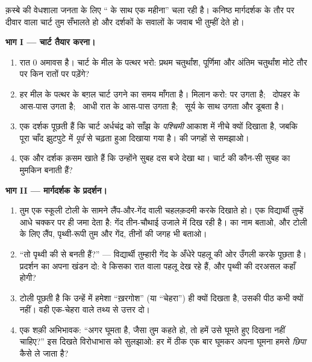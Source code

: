 \begin{problem}\label{pb:g7:moon-phases:1}
क़स्बे की वेधशाला जनता के लिए `` के साथ एक महीना'' चला रही है।
कनिष्ठ मार्गदर्शक के तौर पर दीवार वाला चार्ट तुम सँभालते हो और
दर्शकों के सवालों के जवाब भी तुम्हीं देते हो।

\medskip\noindent\textbf{भाग I --- चार्ट तैयार करना।}
\begin{enumerate}
  \item रात $0$ अमावस है। चार्ट के मील के पत्थर भरो: प्रथम
        चतुर्थांश, पूर्णिमा और अंतिम चतुर्थांश मोटे तौर पर किन रातों
        पर पड़ेंगे?
  \item हर मील के पत्थर के बग़ल चार्ट उगने का समय माँगता है। मिलान
        करो:  पर उगता है; \ दोपहर के आस-पास उगता है; \ आधी
        रात के आस-पास उगता है; \ सूर्य के साथ उगता और डूबता है।
  \item एक दर्शक पूछती हैं कि चार्ट अर्धचंद्र को साँझ के
        \emph{पश्चिमी} आकाश में नीचे क्यों दिखाता है, जबकि पूरा चाँद
        झुटपुटे में \emph{पूर्व} से चढ़ता हुआ दिखाया गया है। 
        की जगहों से समझाओ।
  \item एक और दर्शक क़सम खाते हैं कि उन्होंने सुबह दस बजे 
        देखा था। चार्ट की कौन-सी  सुबह का  मुमकिन बनाती
        हैं?
\end{enumerate}

\medskip\noindent\textbf{भाग II --- मार्गदर्शक के प्रदर्शन।}
\begin{enumerate}[resume]
  \item तुम एक स्कूली टोली के सामने लैंप-और-गेंद वाली चहलक़दमी करके
        दिखाते हो। एक विद्यार्थी तुम्हें आधे चक्कर पर ही जमा देता है:
        गेंद तीन-चौथाई उजाले में दिख रही है।  का नाम बताओ, और टोली
        के लिए लैंप, पृथ्वी-रूपी तुम और गेंद, तीनों की जगह भी बताओ।
  \item ``तो  पृथ्वी की  से बनती हैं?'' --- विद्यार्थी
        तुम्हारी गेंद के अँधेरे पहलू की ओर उँगली करके पूछता है।
        प्रदर्शन का अपना खंडन दो: वे किसका रात वाला पहलू देख रहे हैं,
        और पृथ्वी की  दरअसल कहाँ होगी?
  \item टोली पूछती है कि उन्हें  में हमेशा ``ख़रगोश'' (या
        ``चेहरा'') ही क्यों दिखता है, उसकी पीठ कभी क्यों नहीं। वही
        एक-चेहरा वाले तथ्य से उत्तर दो।
  \item एक शक़ी अभिभावक: ``अगर  घूमता है, जैसा तुम कहते हो,
        तो हमें उसे घूमते हुए दिखना नहीं चाहिए?'' इस दिखते विरोधाभास
        को सुलझाओ:  हर  में ठीक एक बार घूमकर अपना घूमना
        हमसे \emph{छिपा} कैसे ले जाता है?
\end{enumerate}


\end{problem}
